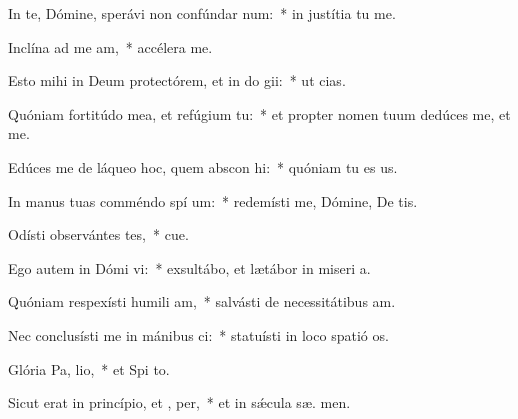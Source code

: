 \item In te, Dómine, sperávi non confúndar  num:~* in justítia tu  me.
\item Inclína ad me  am,~* accélera   me.
\item Esto mihi in Deum protectórem, et in do gii:~* ut   cias.
\item Quóniam fortitúdo mea, et refúgium   tu:~* et propter nomen tuum dedúces me, et  me.
\item Edúces me de láqueo hoc, quem abscon hi:~* quóniam tu es  us.
\item In manus tuas comméndo spí um:~* redemísti me, Dómine, De tis.
\item Odísti observántes tes,~* cue.
\item Ego autem in Dómi vi:~* exsultábo, et lætábor in miseri a.
\item Quóniam respexísti humili am,~* salvásti de necessitátibus  am.
\item Nec conclusísti me in mánibus ci:~* statuísti in loco spatió  os.
\item Glória Pa,  lio,~* et Spi to.
\item Sicut erat in princípio, et ,  per,~* et in sǽcula sæ. men.
